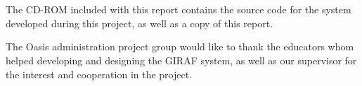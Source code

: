 \\ \\

The CD-ROM included with this report contains the source code for the system developed during this project, as well as a copy of this report.

The Oasis administration project group would like to thank the educators whom helped developing and designing the GIRAF system, as well as our supervisor for the interest and cooperation in the project.